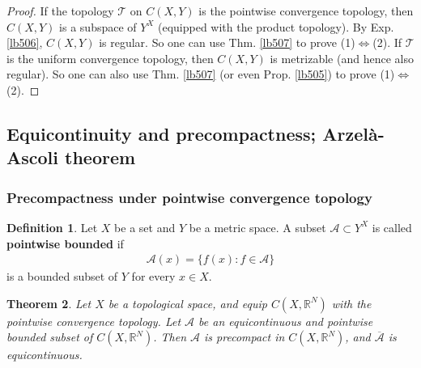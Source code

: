 \documentclass[12pt,b5paper,notitlepage]{article}
\theoremstyle{definition}
\newtheorem{df}{Definition}[section]
\theoremstyle{plain}
\newtheorem{thm}[df]{Theorem}
\newcommand{\mc}{\mathcal}
\newcommand{\ovl}{\overline}
\newcommand{\scr}{\mathscr}
\newcommand{\Rbb}{\mathbb R}
\numberwithin{equation}{section}
\begin{document}
\begin{proof}
If the topology $\mc T$ on $C(X,Y)$ is the pointwise convergence topology, then $C(X,Y)$ is a subspace of $Y^X$ (equipped with the product topology). By Exp. \ref{lb506}, $C(X,Y)$ is regular. So one can use Thm. \ref{lb507} to prove (1)$\Leftrightarrow$(2). If $\mc T$ is the uniform convergence topology, then $C(X,Y)$ is metrizable (and hence also regular). So one can also use Thm. \ref{lb507} (or even Prop. \ref{lb505}) to prove (1)$\Leftrightarrow$(2). 
\end{proof}




\subsection{Equicontinuity and precompactness; Arzel\`a-Ascoli theorem}\label{lb517}


\subsubsection{Precompactness under pointwise convergence topology}


\begin{df}
Let $X$ be a set and $Y$ be a metric space. A subset $\scr A\subset Y^X$ is called \textbf{pointwise bounded}  if
\begin{align}
\scr A(x)=\{f(x):f\in\scr A\}
\end{align}
is a bounded subset of $Y$ for every $x\in X$.
\end{df}





\begin{thm}\label{lb509}
Let $X$ be a topological space, and equip $C(X,\Rbb^N)$ with the pointwise convergence topology. Let $\scr A$ be an equicontinuous and pointwise bounded subset of $C(X,\Rbb^N)$. Then $\scr A$ is precompact in $C(X,\Rbb^N)$, and $\ovl{\scr A}$ is equicontinuous. 
\end{thm}
\end{document}
